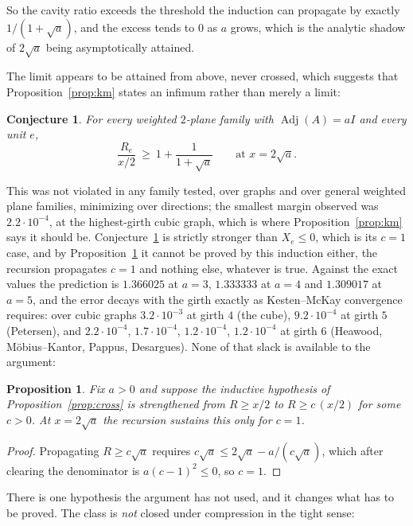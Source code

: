 \documentclass[11pt]{article}
\newtheorem{conjecture}[theorem]{Conjecture}
\newtheorem{proposition}[theorem]{Proposition}
\theoremstyle{remark}
\begin{document}
So the cavity ratio exceeds the threshold the induction can propagate by exactly
$1/(1+\sqrt a)$, and the excess tends to $0$ as $a$ grows, which is the analytic shadow
of $2\sqrt a$ being asymptotically attained.

The limit appears to be attained from above, never crossed, which suggests that
Proposition~\ref{prop:km} states an infimum rather than merely a limit:

\begin{conjecture}\label{conj:km}
For every weighted $2$-plane family with $\operatorname{Adj}(A)=aI$ and every unit $e$,
\[
\frac{R_e}{x/2}\ \ge\ 1+\frac1{1+\sqrt a}\qquad\text{at }x=2\sqrt a .
\]
\end{conjecture}

This was not violated in any family tested, over graphs and over general weighted plane
families, minimizing over directions; the smallest margin observed was
$2.2\cdot10^{-4}$, at the highest-girth cubic graph, which is where
Proposition~\ref{prop:km} says it should be. Conjecture~\ref{conj:km} is strictly
stronger than $X_e\le0$, which is its $c=1$ case, and by Proposition~\ref{prop:rigid} it
cannot be proved by this induction either, the recursion propagates $c=1$ and nothing
else, whatever is true. Against the exact values the prediction is
$1.366025$ at $a=3$, $1.333333$ at $a=4$ and $1.309017$ at $a=5$, and the error decays
with the girth exactly as Kesten--McKay convergence requires: over cubic graphs
$3.2\cdot10^{-3}$ at girth $4$ (the cube), $9.2\cdot10^{-4}$ at girth $5$ (Petersen), and
$2.2\cdot10^{-4}$, $1.7\cdot10^{-4}$, $1.2\cdot10^{-4}$, $1.2\cdot10^{-4}$ at girth $6$
(Heawood, M\"obius--Kantor, Pappus, Desargues). None of that slack is available to the
argument:

\begin{proposition}\label{prop:rigid}
Fix $a>0$ and suppose the inductive hypothesis of Proposition~\ref{prop:cross} is
strengthened from $R\ge x/2$ to $R\ge c\,(x/2)$ for some $c>0$. At $x=2\sqrt a$ the
recursion sustains this only for $c=1$.
\end{proposition}

\begin{proof}
Propagating $R\ge c\sqrt a$ requires $c\sqrt a\le2\sqrt a-a/(c\sqrt a)$, which after
clearing the denominator is $a(c-1)^2\le0$, so $c=1$.
\end{proof}

There is one hypothesis the argument has not used, and it changes what has to be proved.
The class is \emph{not} closed under compression in the tight sense:
\end{document}
